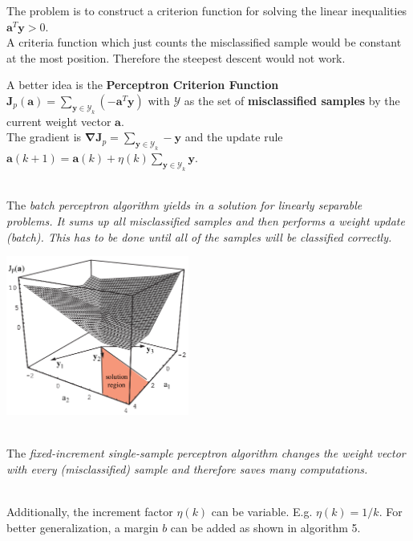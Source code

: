   \begin{minipage}{12cm}
    The problem is to construct a criterion function for solving the linear inequalities $\bm a^T \bm y > 0$. \\
    A criteria function which just counts the misclassified sample would be constant at the most position. Therefore the steepest descent would not work.
    
    A better idea is the \textbf{Perceptron Criterion Function}
    $\bm J_p(\bm a) = \sum\limits_{\bm y \in \mathcal{Y}_k} (-\bm a^T \bm y)$  with $\mathcal{Y}$ as the set
    of \textbf{misclassified samples} by the current weight vector $\bm a$.\\
    The gradient is $\bm {\nabla J}_p = \sum\limits_{\bm y\in \mathcal{Y}_k} -\bm y$
    and the update rule $\bm a(k+1) = \bm a(k) + \eta(k) \sum\limits_{\bm y\in \mathcal{Y}_k} \bm y$.
    
    
    \\
    The \em batch perceptron algorithm \em yields in a solution for
    linearly separable problems. It sums up \em all \em misclassified samples and then performs a weight update (batch). 
    This has to be done until all of the samples will be classified correctly.
   	\end{minipage}
    \hspace{8mm} 
    \begin{minipage}{6cm}
    	 \includegraphics[width=6cm]{./images/perceptron.png}
    \end{minipage}
    
    
    \\
    The \em fixed-increment single-sample perceptron algorithm \em changes the weight vector
    with every (misclassified) sample and therefore saves many computations.
    
    \\
    Additionally, the increment factor $\eta(k)$ can be variable. E.g. $\eta(k)=1/k$. For better 
    generalization, a margin $b$ can be added as shown in algorithm 5.  
    

